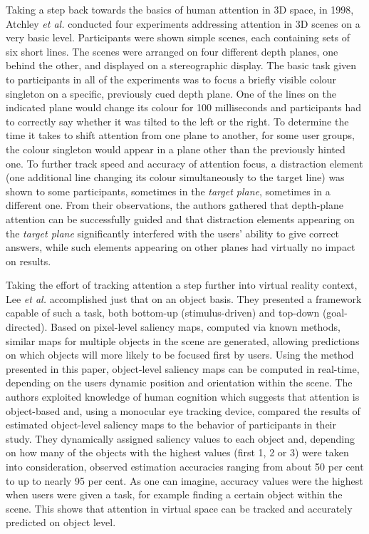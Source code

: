 Taking a step back towards the basics of human attention in 3D space, in 1998, Atchley \textit{et al.} \cite{atchleyattentional} conducted four experiments addressing attention in 3D scenes on a very basic level. Participants were shown simple scenes, each containing sets of six short lines. The scenes were arranged on four different depth planes, one behind the other, and displayed on a stereographic display. The basic task given to participants in all of the experiments was to focus a briefly visible colour singleton on a specific, previously cued depth plane. One of the lines on the indicated plane would change its colour for 100 milliseconds and participants had to correctly say whether it was tilted to the left or the right. To determine the time it takes to shift attention from one plane to another, for some user groups, the colour singleton would appear in a plane other than the previously hinted one. To further track speed and accuracy of attention focus, a distraction element (one additional line changing its colour simultaneously to the target line) was shown to some participants, sometimes in the \textit{target plane}, sometimes in a different one. From their observations, the authors gathered that depth-plane attention can be successfully guided and that distraction elements appearing on the \textit{target plane} significantly interfered with the users' ability to give correct answers, while such elements appearing on other planes had virtually no impact on results.

Taking the effort of tracking attention a step further into virtual reality context, Lee \textit{et al.} \cite{lee2007real} accomplished just that on an object basis. They presented a framework capable of such a task, both bottom-up (stimulus-driven) and top-down (goal-directed). Based on pixel-level saliency maps, computed via known methods, similar maps for multiple objects in the scene are generated, allowing predictions on which objects will more likely to be focused first by users. Using the method presented in this paper, object-level saliency maps can be computed in real-time, depending on the users dynamic position and orientation within the scene. The authors exploited knowledge of human cognition which suggests that attention is object-based \cite{o1999fmri} and, using a monocular eye tracking device, compared the results of estimated object-level saliency maps to the behavior of participants in their study. They dynamically assigned saliency values to each object and, depending on how many of the objects with the highest values (first 1, 2 or 3) were taken into consideration, observed estimation accuracies ranging from about 50 per cent to up to nearly 95 per cent. As one can imagine, accuracy values were the highest when users were given a task, for example finding a certain object within the scene. This shows that attention in virtual space can be tracked and accurately predicted on object level.

